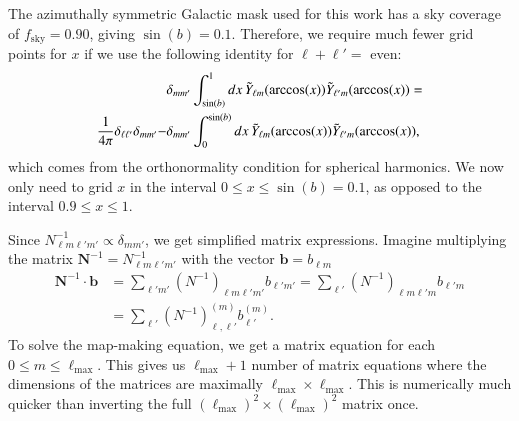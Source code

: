 \documentclass[twocolumn]{../common/aa}
\begin{document}
The azimuthally symmetric Galactic mask used for this work has a sky coverage of $f_{\mathrm{sky}} = 0.90$, giving $\sin(b) = 0.1$. Therefore, we require much fewer grid points for $x$ if we use the following identity for $\ell+\ell' = $ even:
\begin{align}
&\delta_{mm'} \int_{\sin(b)}^{1} dx \, \Tilde{Y}_{\ell m}(\arccos(x)) \Tilde{Y}_{\ell' m}(\arccos(x)) = \\
\frac{1}{4\pi}\delta_{\ell \ell'}\delta_{m m'} - &\delta_{mm'} \int_{0}^{\sin(b)} dx \, \Tilde{Y}_{\ell m}(\arccos(x)) \Tilde{Y}_{\ell' m}(\arccos(x)),
\end{align}
which comes from the orthonormality condition for spherical harmonics. We now only need to grid $x$ in the interval $0\leq x \leq \sin(b) = 0.1$, as opposed to the interval $0.9 \leq x \leq 1$.

Since $N^{-1}_{\ell m \ell' m'} \propto \delta_{m m'}$, we get simplified matrix expressions. Imagine multiplying the matrix $\boldsymbol{N}^{-1} = N^{-1}_{\ell m \ell' m'}$ with the vector $\boldsymbol{b} = b_{\ell m}$
\begin{align}
\boldsymbol{N}^{-1} \cdot \boldsymbol{b} &= \sum_{\ell' m'}\left(N^{-1}\right)_{\ell m \ell' m'}b_{\ell' m'} = \sum_{\ell'}\left(N^{-1}\right)_{\ell m \ell' m}b_{\ell' m}\\
&= \sum_{\ell' }\left(N^{-1}\right)^{(m)}_{\ell, \ell'}b^{(m)}_{\ell'}.
\end{align}
To solve the map-making equation, we get a matrix equation for each $0 \leq m \leq \ell_{\mathrm{max}}$. This gives us $\ell_{\textrm{max}}+1$ number of matrix equations where the dimensions of the matrices are maximally $\ell_{\textrm{max}} \times \ell_{\textrm{max}}$. This is numerically much quicker than inverting the full $(\ell_{\textrm{max}})^2 \times (\ell_{\textrm{max}})^2$ matrix once.
\end{document}

